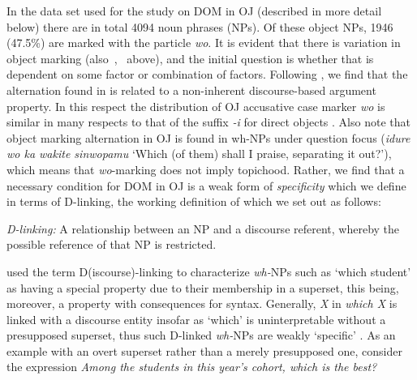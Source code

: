 \documentclass[output=paper]{LSP/langsci}
\begin{document}
In the data set used for the study on DOM in OJ (described in more
detail below) there are in total 4094  noun phrases
(NPs). Of these object NPs, 1946 (47.5\%) are marked with the
 particle \textit{wo}. It is evident that there is
variation in object marking
(\cf also~,~ above), and
the initial question is whether that is dependent on some factor or
combination of factors. Following
\citet{Frellesvigetal2015Differential}, we find that the alternation
found in  is related to a non-inherent discourse-based
argument property. In this respect the distribution of OJ accusative
case marker \textit{wo} is similar in many respects to that of the
  suffix \textit{-i} for direct objects
\citep{Enc1991Semantics}. Also note that object marking alternation
in OJ is found in wh-NPs under question focus (\eg \textit{idure wo ka
 wakite sinwopamu} ‘Which (of them) shall I praise, separating it
out?’), which means that \emph{wo}-marking does not imply topichood. Rather,
we find that a necessary condition for DOM in OJ is a weak form of
\textit{specificity} which we define in terms of D-linking, the
working definition of which we set out as follows:

\begin{exe}
\ex%
\label{07-fr-ex:3}
\textit{D-linking:} A relationship between an NP and a  discourse referent, whereby the possible reference of that NP is restricted. 
\end{exe}

\citet{Pesetsky1987Binding} used the term D(iscourse)-linking to
characterize \textit{wh-}NPs such as ‘which student’ as having a
special property due to their membership in a  superset, this
being, moreover, a property with consequences for syntax. Generally,
\textit{X} in \textit{which X} is linked with a  discourse
entity insofar as ‘which’ is uninterpretable without a presupposed
superset, thus such D-linked \textit{wh-}NPs are weakly ‘specific’
\citep{Cinque1990Dependencies,Kiss1993WH-movement}. As an example
with an overt superset rather than a merely presupposed one, consider
the expression \textit{Among the students in this year’s cohort, which
 is the best?}
\end{document}
